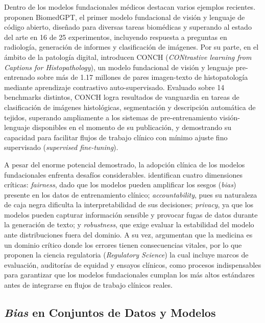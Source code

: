 Dentro de los modelos fundacionales médicos destacan varios ejemplos recientes. \textcite{Zhang2024}
proponen
BiomedGPT, el primer modelo fundacional de visión y lenguaje de código abierto, diseñado para 
diversas tareas biomédicas y superando al estado del arte en 16 de
25 experimentos, incluyendo respuesta a preguntas en radiología, generación de
informes y clasificación de imágenes. Por su parte, en el ámbito de la patología digital, \textcite{Lu2024}
introducen CONCH (\textit{CONtrastive learning from Captions for Histopathology}), 
un modelo fundacional de visión y lenguaje
pre-entrenado sobre más de 1.17 millones de pares imagen-texto de histopatología
mediante aprendizaje contrastivo auto-supervisado. Evaluado sobre 14 benchmarks
distintos, CONCH logra resultados de vanguardia en tareas de clasificación de
imágenes histológicas, segmentación y descripción automática de tejidos,
superando ampliamente a los sistemas de
pre-entrenamiento visión-lenguaje disponibles en el momento de su publicación,
y demostrando su capacidad para facilitar flujos de trabajo clínico con mínimo
ajuste fino supervisado (\textit{supervised fine-tuning}).

A pesar del enorme potencial demostrado, la adopción clínica de los modelos
fundacionales enfrenta desafíos considerables. \textcite{liu2024surveymedicallargelanguage} identifican
 cuatro
dimensiones críticas: \textit{fairness}, dado que los modelos pueden amplificar
los sesgos (\textit{bias}) presente en los datos de entrenamiento clínico; \textit{accountability},
pues su naturaleza de caja negra dificulta la interpretabilidad de sus decisiones;
\textit{privacy}, ya que los modelos pueden capturar información sensible y
provocar fugas de datos durante la generación de texto; y \textit{robustness},
que exige evaluar la estabilidad del modelo ante distribuciones fuera del dominio. 
A su vez, \textcite{niu2026foundationmodelsmedicalimaging} argumentan que la medicina es un dominio crítico donde los errores
tienen consecuencias vitales, por lo que proponen la ciencia regulatoria (\textit{Regulatory Science})
la cual incluye marcos de evaluación, auditorías de equidad y ensayos clínicos, 
como procesos indispensables para garantizar que los modelos fundacionales cumplan
los más altos estándares antes de integrarse en flujos de trabajo clínicos reales.


\subsection{\textit{Bias} en Conjuntos de Datos y Modelos}

